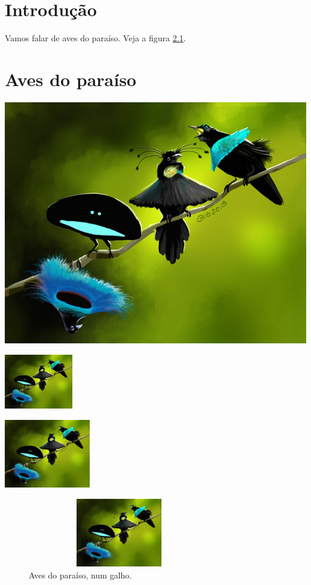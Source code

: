

\usepackage{hyperref}

\usepackage{graphicx}



\tableofcontents

\listoffigures
\chapter{Introdução}

Vamos falar de aves do paraíso.
Veja a figura \ref{fig:paraiso}.

\chapter{Aves do paraíso}

\includegraphics[scale=0.3]{paraiso} 


\includegraphics[width=3cm]{paraiso} 

\includegraphics[height=3cm]{paraiso} 




\begin{figure}
\begin{center}\includegraphics[width=8cm,height=3cm]{paraiso} 
\end{center}
\caption{Aves do paraíso, num galho.}
\label{fig:paraiso}
\end{figure}
